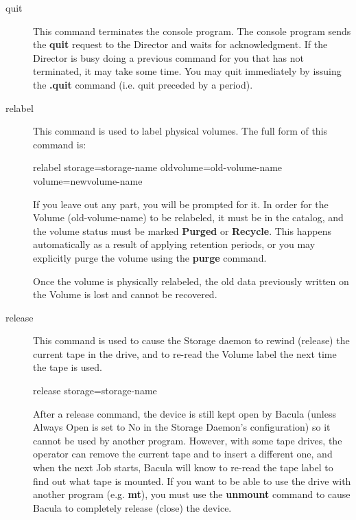 \begin{description}
\item [quit]
   This command terminates the console program. The  console program sends the
   {\bf quit} request to the Director  and waits for acknowledgment. If the
   Director is busy doing  a previous command for you that has not terminated, it
   may  take some time. You may quit immediately by issuing the  {\bf .quit}
   command (i.e. quit preceded by a period).  

\item [relabel]
   This command is used to label physical volumes.  The full form of this
   command is:

relabel storage=\lt{}storage-name\gt{} oldvolume=\lt{}old-volume-name\gt{}  
    volume=\lt{}newvolume-name\gt{} 
 
   If you leave out any part, you will be prompted for it.  In order for
   the Volume (old-volume-name) to be relabeled, it must be in the catalog,
   and the volume status must be marked {\bf Purged} or {\bf Recycle}.
   This happens automatically as a result of applying retention periods, or
   you may explicitly purge the volume using the {\bf purge} command.

   Once the volume is physically relabeled, the old data previously written
   on the Volume is lost and cannot be recovered.

\item [release]
   This command is used to cause the Storage daemon to rewind (release) the
   current tape in the drive, and to re-read the Volume label the next time
   the tape is used.

release storage=\lt{}storage-name\gt{}  

   After a release command, the device is still kept open by Bacula (unless
   Always Open is set to No in the Storage Daemon's configuration) so it
   cannot be used by another program.  However, with some tape drives, the
   operator can remove the current tape and to insert a different one, and
   when the next Job starts, Bacula will know to re-read the tape label to
   find out what tape is mounted.  If you want to be able to use the drive
   with another program (e.g.  {\bf mt}), you must use the {\bf unmount}
   command to cause Bacula to completely release (close) the device.


\end{description}
